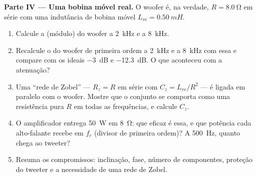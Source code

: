 \begin{problem}
\medskip
\noindent\textbf{Parte IV --- Uma bobina móvel real.}
O woofer é, na verdade, $R = \qty{8.0}{\ohm}$ em série com uma indutância
de bobina móvel $L_{vc} = \qty{0.50}{mH}$.
\begin{enumerate}[resume]
  \item Calcule a  (módulo) do woofer a \qty{2}{kHz} e a
        \qty{8}{kHz}.
  \item Recalcule o  do woofer de primeira ordem a \qty{2}{kHz} e a
        \qty{8}{kHz} com essa  e compare com os ideais
        \qty{-3}{dB} e \qty{-12.3}{dB}. O que aconteceu com a atenuação?
  \item Uma ``rede de Zobel'' --- $R_z = R$ em série com $C_z =
        L_{vc}/R^2$ --- é ligada em paralelo com o woofer. Mostre
        que o conjunto se comporta como uma resistência pura $R$ em todas as
        frequências, e calcule $C_z$.
  \item O amplificador entrega \qty{50}{W} em \qty{8}{\ohm}: que 
        eficaz é essa, e que potência cada alto-falante recebe em
        $f_c$ (divisor de primeira ordem)? A \qty{500}{Hz}, quanto chega
        ao tweeter?
  \item Resuma os compromissos: inclinação, fase, número de componentes,
        proteção do tweeter e a necessidade de uma rede de Zobel.
\end{enumerate}
\end{problem}
